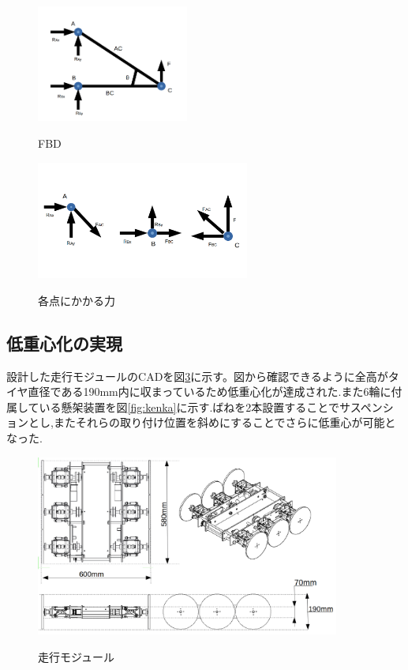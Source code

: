 \documentclass[12pt,oneside]{sotsuken_paper}
\begin{document}
\begin{figure}[htp]
 \begin{center}
  \includegraphics[width=50mm]{img/hard/fig7.png}
 　\caption{FBD}
  \label{fig:fbd}%
 \end{center}
\end{figure}

\begin{figure}[htp]
 \begin{center}
  \includegraphics[width=70mm]{img/hard/fig8.png}
 　\caption{各点にかかる力}
  \label{fig:bai}%
 \end{center}
\end{figure}




\subsection{低重心化の実現}
設計した走行モジュールのCADを図\ref{fig:cad}に示す。図から確認できるように全高がタイヤ直径である190mm内に収まっているため低重心化が達成された.また6輪に付属している懸架装置を図\ref{fig:kenka}に示す.ばねを2本設置することでサスペンションとし,またそれらの取り付け位置を斜めにすることでさらに低重心が可能となった.

\begin{figure}[htp]
 \begin{center}
  \includegraphics[width=100mm]{img/hard/4.png}
 　\caption{走行モジュール}
  \label{fig:cad}%
 \end{center}
\end{figure}
\end{document}
